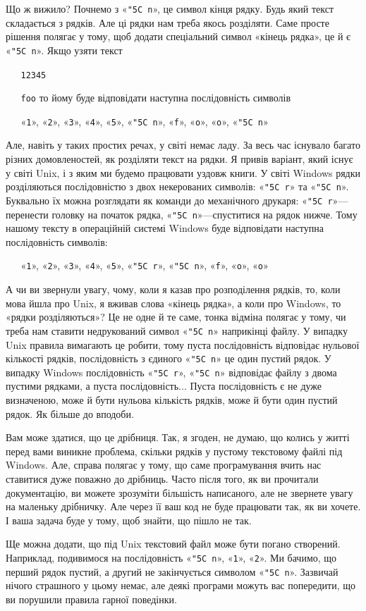 \documentclass{book}
\newcommand{\escape}[1]{\texttt{\char"5C #1}}
\newcommand{\textseq}[1]{\par\vbox{\texttt{~~~}#1}}
\newcommand{\chr}[1]{«\texttt{#1}»}
\newcommand{\chesc}[1]{\chr{\escape{#1}}}
\begin{document}
Що ж вижило?
Почнемо з \chesc n, це символ кінця рядку.
Будь який текст складається з рядків.
Але ці рядки нам треба якось розділяти.
Саме просте рішення полягає у тому, щоб додати спеціальний символ «кінець рядка», це й є \chesc n.
Якщо узяти текст
\textseq{\texttt{12345}}
\textseq{\texttt{foo}}
\noindent то йому буде відповідати наступна послідовність символів
\textseq{\chr1, \chr2, \chr3, \chr4, \chr5, \chesc n, \chr f, \chr o, \chr o, \chesc n}

Але, навіть у таких простих речах, у світі немає ладу.
За весь час існувало багато різних домовленостей, як розділяти текст на рядки.
Я привів варіант, який існує у світі Unix, і з яким ми будемо працювати уздовж книги.
У світі Windows рядки розділяються послідовністю з двох некерованих символів: \chesc r та \chesc n.
Буквально їх можна розглядати як команди до механічного друкаря: \chesc r---перенести головку на початок рядка, \chesc n---спуститися на рядок нижче.
Тому нашому тексту в операційній системі Windows буде відповідати наступна послідовність символів:
\textseq{\chr1, \chr2, \chr3, \chr4, \chr5, \chesc r, \chesc n, \chr f, \chr o, \chr o}

А чи ви звернули увагу, чому, коли я казав про розподілення рядків, то, коли мова йшла про Unix, я вживав слова «кінець рядка», а коли про Windows, то «рядки розділяються»?
Це не одне й те саме, тонка відміна полягає у тому, чи треба нам ставити недрукований символ \chesc n наприкінці файлу.
У випадку Unix правила вимагають це робити, тому пуста послідовність відповідає нульової кількості рядків, послідовність з єдиного \chesc n це один пустий рядок.
У випадку Windows послідовність \chesc r, \chesc n відповідає файлу з двома пустими рядками, а пуста послідовність...
Пуста послідовність є не дуже визначеною, може й бути нульова кількість рядків, може й бути один пустий рядок.
Як більше до вподоби.

Вам може здатися, що це дрібниця.
Так, я згоден, не думаю, що колись у житті перед вами виникне проблема, скільки рядків у пустому текстовому файлі під Windows.
Але, справа полягає у тому, що саме програмування вчить нас ставитися дуже поважно до дрібниць.
Часто після того, як ви прочитали документацію, ви можете зрозуміти більшість написаного, але не звернете увагу на маленьку дрібничку.
Але через її ваш код не буде працювати так, як ви хочете.
І ваша задача буде у тому, щоб знайти, що пішло не так.

Ще можна додати, що під Unix текстовий файл може бути погано створений.
Наприклад, подивимося на послідовність \chesc n, \chr1, \chr2.
Ми бачимо, що перший рядок пустий, а другий не закінчується символом \chesc n.
Зазвичай нічого страшного у цьому немає, але деякі програми можуть вас попередити, що ви порушили правила гарної поведінки.
\end{document}
